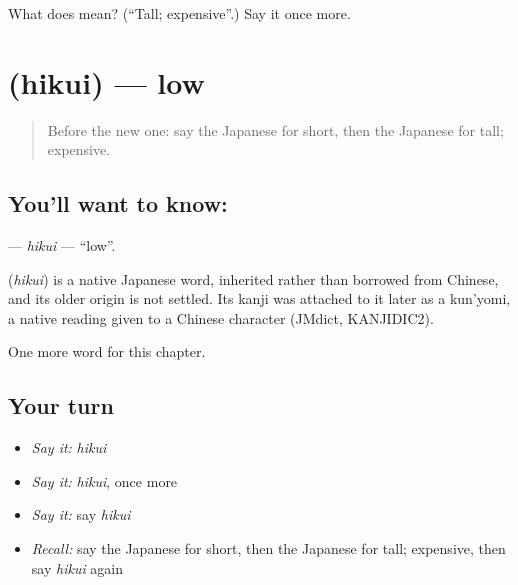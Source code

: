\begin{tcolorbox}[breakable,colback=teal!4,colframe=teal!35!black,title={Before you move on}]
What does  mean? (\textquotedblleft{}Tall; expensive\textquotedblright{}.) Say it once more.
\end{tcolorbox}
\section[\texorpdfstring{\ja{ひくい} (hikui)}{ひくい (hikui)}]{ (hikui) — low}

\label{lesson:JA-C49-hikui}



\begin{quote}
Before the new one: say the Japanese for short, then the Japanese for tall; expensive.
\end{quote}

\subsection*{You'll want to know: }
\textbf{} — \emph{hikui} — \textquotedblleft{}low\textquotedblright{}.

\begin{cousinweb}
\textbf{} (\emph{hikui}) is a native Japanese word, inherited rather than borrowed from Chinese, and its older origin is not settled. Its kanji was attached to it later as a kun'yomi, a native reading given to a Chinese character (JMdict, KANJIDIC2).
\end{cousinweb}

\begin{grammarlens}[title={What you've built}]
One more word for this chapter.
\end{grammarlens}

\subsection*{Your turn}
\begin{itemize}
\raggedright
  \item \emph{Say it:} \emph{hikui}
  \item \emph{Say it:} \emph{hikui}, once more
  \item \emph{Say it:} say \emph{hikui}
  \item \emph{Recall:} say the Japanese for short, then the Japanese for tall; expensive, then say \emph{hikui} again
\end{itemize}

